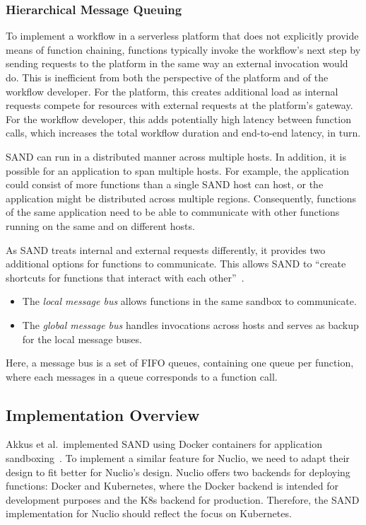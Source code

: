 \subsubsection{Hierarchical Message Queuing}

To implement a workflow in a serverless platform that does not explicitly provide means of function chaining, functions typically invoke the workflow's next step by sending requests to the platform in the same way an external invocation would do.
This is inefficient from both the perspective of the platform and of the workflow developer.
For the platform, this creates additional load as internal requests compete for resources with external requests at the platform's gateway.
For the workflow developer, this adds potentially high latency between function calls, which increases the total workflow duration and end-to-end latency, in turn.

SAND can run in a distributed manner across multiple hosts.
In addition, it is possible for an application to span multiple hosts.
For example, the application could consist of more functions than a single SAND host can host, or the application might be distributed across multiple regions.
Consequently, functions of the same application need to be able to communicate with other functions running on the same and on different hosts.

As SAND treats internal and external requests differently, it provides two additional options for functions to communicate.
This allows SAND to \enquote{create shortcuts for functions that interact with each other}~\cite{akkus2018sand}.
\begin{itemize}
    \item The \emph{local message bus} allows functions in the same sandbox to communicate.
    \item The \emph{global message bus} handles invocations across hosts and serves as backup for the local message buses.
\end{itemize}
Here, a message bus is a set of FIFO queues, containing one queue per function, where each messages in a queue corresponds to a function call.

\subsection{Implementation Overview}

Akkus et al.~implemented SAND using Docker containers for application sandboxing~\cite{akkus2018sand}.
To implement a similar feature for Nuclio, we need to adapt their design to fit better for Nuclio's design.
Nuclio offers two backends for deploying functions: Docker and Kubernetes, where the Docker backend is intended for development purposes and the K8s backend for production. 
Therefore, the SAND implementation for Nuclio should reflect the focus on Kubernetes.

